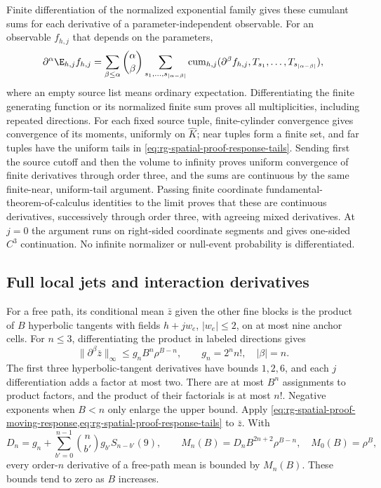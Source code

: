 Finite differentiation of the normalized exponential family gives these
cumulant sums for each derivative of a parameter-independent observable.
For an observable \(f_{h,j}\) that depends on the parameters,
\begin{equation}
 \partial^\alpha\E_{h,j}f_{h,j}
 =\sum_{\beta\le\alpha}\binom\alpha\beta
   \sum_{s_1,\ldots,s_{|\alpha-\beta|}}
   \operatorname{cum}_{h,j}(\partial^\beta f_{h,j},T_{s_1},\ldots,
                                      T_{s_{|\alpha-\beta|}}),
 \label{eq:rg-spatial-proof-moving-response}
\end{equation}
where an empty source list means ordinary expectation. Differentiating the
finite generating function or its normalized finite sum proves all
multiplicities, including repeated directions. For each fixed source
tuple, finite-cylinder convergence gives convergence of its moments,
uniformly on \(\widehat K\); near tuples form a finite set, and far tuples
have the uniform tails in \cref{eq:rg-spatial-proof-response-tails}.
Sending first the source cutoff and then the volume to infinity proves
uniform convergence of finite derivatives through order three, and the sums
are continuous by the same finite-near, uniform-tail argument. Passing
finite coordinate fundamental-theorem-of-calculus identities to the limit
proves that these are continuous derivatives, successively through order
three, with agreeing mixed derivatives. At \(j=0\) the argument runs on
right-sided coordinate segments and gives one-sided \(C^3\) continuation.
No infinite normalizer or null-event probability is differentiated.

\subsection{Full local jets and interaction derivatives}
\label{sec:rg-spatial-proof-local-jets}

For a free path, its conditional mean \(\bar z\) given the other fine blocks
is the product of \(B\) hyperbolic tangents with fields \(h+jw_e\),
\(|w_e|\le2\), on at most nine anchor cells. For \(n\le3\),
differentiating the product in labeled directions gives
\begin{equation}
 \|\partial^\beta\bar z\|_\infty
 \le g_nB^n\rho^{B-n},\qquad g_n=2^nn!,\quad |\beta|=n.
 \label{eq:rg-spatial-proof-product-jets}
\end{equation}
The first three hyperbolic-tangent derivatives have bounds \(1,2,6\), and
each \(j\) differentiation adds a factor at most two. There are at most
\(B^n\) assignments to product factors, and the product of their factorials
is at most \(n!\). Negative exponents when \(B<n\) only enlarge the upper
bound. Apply
\cref{eq:rg-spatial-proof-moving-response,eq:rg-spatial-proof-response-tails}
to \(\bar z\). With
\begin{equation}
 D_n=g_n+\sum_{b'=0}^{n-1}\binom n{b'}g_{b'}S_{n-b'}(9),\qquad
 M_n(B)=D_nB^{2n+2}\rho^{B-n},\quad M_0(B)=\rho^B,
 \label{eq:rg-spatial-proof-mean-jets}
\end{equation}
every order-\(n\) derivative of a free-path mean is bounded by \(M_n(B)\).
These bounds tend to zero as \(B\) increases.

